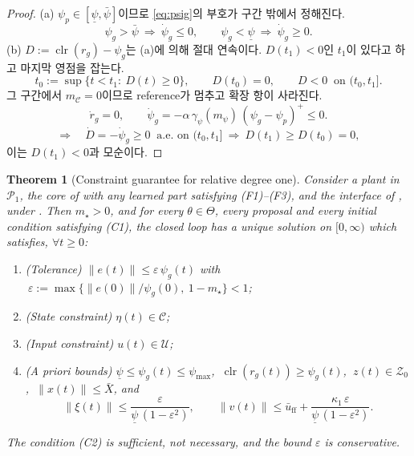 \documentclass[11pt]{article}\usepackage[margin=1in]{geometry}\usepackage{amsmath,amssymb,amsthm,mathtools}\usepackage{graphicx}\graphicspath{{figures/}{../figures/}{figs/}{./}}\usepackage{enumitem}\usepackage{hyperref}\usepackage{cleveref}\usepackage{tikz}\usetikzlibrary{arrows.meta,positioning,calc,shapes.geometric}\usepackage{float}\usepackage[most]{tcolorbox}\usepackage{kotex}\usepackage{booktabs}\emergencystretch=1.6em\tolerance=2000 \crefname{assumption}{Assumption}{Assumptions}\Crefname{assumption}{Assumption}{Assumptions}\crefname{definition}{Definition}{Definitions}\Crefname{definition}{Definition}{Definitions}\crefname{proposition}{Proposition}{Propositions}\Crefname{proposition}{Proposition}{Propositions}\crefname{fact}{Fact}{Facts}\Crefname{fact}{Fact}{Facts} \newtheorem{assumption}{Assumption}\newtheorem{definition}{Definition}\newtheorem{lemma}{Lemma}\newtheorem{proposition}{Proposition}\newtheorem{theorem}{Theorem}\newtheorem{corollary}{Corollary}\newtheorem{fact}{Fact}\theoremstyle{remark}\newtheorem{remark}{Remark} \newcommand{\R}{\mathbb{R}}\newcommand{\U}{\mathcal U}
\newcommand{\Cset}{\mathcal C}\newcommand{\Pcl}{\mathcal P}\newcommand{\Zset}{\mathcal Z_0}\newcommand{\Xset}{\mathcal X_0}
\DeclareMathOperator{\clr}{clr}\newcommand{\norm}[1]{\lVert #1\rVert}\newcommand{\what}{\hat w}
\begin{document}
\begin{proof}
(a) $\psi_p\in[\underline\psi,\bar\psi]$이므로 \eqref{eq:psig}의 부호가 구간 밖에서 정해진다.
\[
\psi_g>\bar\psi\ \Rightarrow\ \dot\psi_g\le0,\qquad \psi_g<\underline\psi\ \Rightarrow\ \dot\psi_g\ge0 .
\]
(b) $D:=\clr(r_g)-\psi_g$는 (a)에 의해 절대 연속이다. $D(t_1)<0$인 $t_1$이 있다고 하고 마지막 영점을 잡는다.
\[
t_0:=\sup\{t<t_1:\ D(t)\ge0\},\qquad D(t_0)=0,\qquad D<0\ \text{ on }(t_0,t_1].
\]
그 구간에서 $m_{\Cset}=0$이므로 reference가 멈추고 확장 항이 사라진다.
\[
\dot r_g=0,\qquad \dot\psi_g=-\alpha\,\gamma_\psi(m_\psi)\,(\psi_g-\psi_p)^+\le0 .
\]
\[
\Longrightarrow\quad \dot D=-\dot\psi_g\ge0\ \text{ a.e. on }(t_0,t_1]\ \Longrightarrow\ D(t_1)\ge D(t_0)=0 ,
\]
이는 $D(t_1)<0$과 모순이다.
\end{proof}

\begin{theorem}[Constraint guarantee for relative degree one]
\label{thm:main}
Consider a plant in $\Pcl_1$, the core of  with any learned part satisfying (F1)--(F3), and the interface of , under . Then $m_\star>0$, and for every $\theta\in\Theta$, every proposal and every initial condition satisfying (C1), the closed loop has a unique solution on $[0,\infty)$ which satisfies, $\forall t\ge0$:
\begin{enumerate}[label=(\alph*)]
\item (Tolerance) $\norm{e(t)}\le\varepsilon\,\psi_g(t)$ with $\ \varepsilon:=\max\big\{\norm{e(0)}/\psi_g(0),\ 1-m_\star\big\}<1$;
\item (State constraint) $\eta(t)\in\Cset$;
\item (Input constraint) $u(t)\in\U$;
\item (A priori bounds) $\underline\psi\le\psi_g(t)\le\psi_{\max}$, $\ \clr(r_g(t))\ge\psi_g(t)$, $\ z(t)\in\Zset$, $\ \norm{x(t)}\le\bar X$, and
\[
\norm{\xi(t)}\le\frac{\varepsilon}{\underline\psi\,(1-\varepsilon^2)},\qquad \norm{v(t)}\le\bar u_{\mathrm{ff}}+\frac{\kappa_1\,\varepsilon}{\underline\psi\,(1-\varepsilon^2)} .
\]
\end{enumerate}
The condition (C2) is sufficient, not necessary, and the bound $\varepsilon$ is conservative.
\end{theorem}
\end{document}
